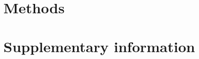 \documentclass[11pt]{article}
\begin{document}
\section*{Methods}

\clearpage
\section*{Supplementary information}

\end{document}
